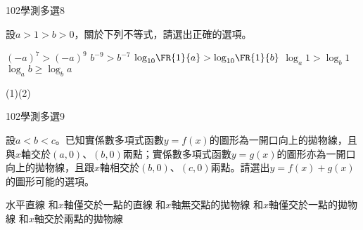 \begin{QUESTIONS}
\begin{QUESTION}
    \end{QUESTION}
    \begin{QUESTION}
        \begin{ExamInfo}{102}{學測}{多選}{8}
        \end{ExamInfo}
        \begin{ExamAnsRateInfo}{47}{68}{50}{23}
        \end{ExamAnsRateInfo}
        \begin{QBODY}
			設$a>1>b>0$，關於下列不等式，請選出正確的選項。
			\begin{QOPS}
				\QOP ${{(-a)}^{7}}>{{(-a)}^{9}}$
				\QOP ${{b}^{-9}}>{{b}^{-7}}$
				\QOP ${{\log }_{10}}\FR{1}{a}>{{\log }_{10}}\FR{1}{b}$
				\QOP ${{\log }_{a}}1>{{\log }_{b}}1$
				\QOP ${{\log }_{a}}b\ge {{\log }_{b}}a$
			\end{QOPS}
        \end{QBODY}
        \begin{QFROMS}
        \end{QFROMS}
        \begin{QTAGS}\end{QTAGS}
        \begin{QANS}
            (1)(2)
        \end{QANS}
        \begin{QSOLLIST}
        \end{QSOLLIST}
        \begin{QEMPTYSPACE}
        \end{QEMPTYSPACE}
    \end{QUESTION}
    \begin{QUESTION}
        \begin{ExamInfo}{102}{學測}{多選}{9}
        \end{ExamInfo}
        \begin{ExamAnsRateInfo}{43}{64}{40}{25}
        \end{ExamAnsRateInfo}
        \begin{QBODY}
			設$a<b<c$。已知實係數多項式函數$y=f(x)$的圖形為一開口向上的拋物線，且與$x$軸交於$(a,0)$、$(b,0)$兩點；實係數多項式函數$y=g(x)$的圖形亦為一開口向上的拋物線，且跟$x$軸相交於$(b,0)$、$(c,0)$兩點。請選出$y=f(x)+g(x)$的圖形可能的選項。
			\begin{QOPS}
				\QOP 水平直線
				\QOP 和$x$軸僅交於一點的直線
				\QOP 和$x$軸無交點的拋物線
				\QOP 和$x$軸僅交於一點的拋物線
				\QOP 和$x$軸交於兩點的拋物線
			\end{QOPS}
        \end{QBODY}

\end{QUESTION}
\end{QUESTIONS}
